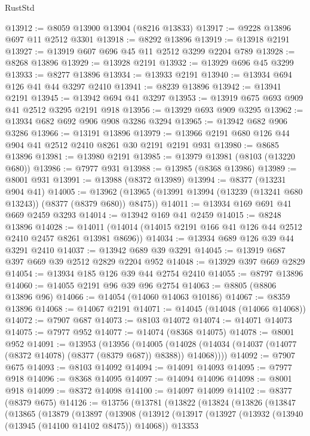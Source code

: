 \begin{lexlean}{RustStd}
\begin{coremodule}
@13912 := @8059 @13900 @13904 (@8216 @13833)
@13917 := @9228 @13896 @697 @11 @2512 @3301
@13918 := @8292 @13896
@13919 := @13918 @2191
@13927 := @13919 @607 @696 @45 @11 @2512 @3299 @2204 @789
@13928 := @8268 @13896
@13929 := @13928 @2191
@13932 := @13929 @696 @45 @3299
@13933 := @8277 @13896
@13934 := @13933 @2191
@13940 := @13934 @694 @126 @41 @44 @3297 @2410
@13941 := @8239 @13896
@13942 := @13941 @2191
@13945 := @13942 @694 @41 @3297
@13953 := @13919 @675 @693 @909 @41 @2512 @3295 @2191 @918
@13956 := @13929 @693 @909 @3295
@13962 := @13934 @682 @692 @906 @908 @3286 @3294
@13965 := @13942 @682 @906 @3286
@13966 := @13191 @13896
@13979 := @13966 @2191 @680 @126 @44 @904 @41 @2512 @2410 @8261 @30 @2191 @2191 @931
@13980 := @8685 @13896
@13981 := @13980 @2191
@13985 := @13979 @13981 (@8103 (@13220 @680))
@13986 := @7977 @931
@13988 := @13985 (@8368 @13986)
@13989 := @8001 @931
@13991 := @13988 (@8372 @13989)
@13994 := @8377 (@13231 @904 @41)
@14005 := @13962 (@13965 (@13991 @13994 (@13239 (@13241 @680 @13243)) (@8377 (@8379 @680)) @8475))
@14011 := @13934 @169 @691 @41 @669 @2459 @3293
@14014 := @13942 @169 @41 @2459
@14015 := @8248 @13896
@14028 := @14011 (@14014 (@14015 @2191 @166 @41 @126 @44 @2512 @2410 @2457 @8261 @13981 @8696))
@14034 := @13934 @689 @126 @39 @44 @3291 @2410
@14037 := @13942 @689 @39 @3291
@14045 := @13919 @687 @397 @669 @39 @2512 @2829 @2204 @952
@14048 := @13929 @397 @669 @2829
@14054 := @13934 @185 @126 @39 @44 @2754 @2410
@14055 := @8797 @13896
@14060 := @14055 @2191 @96 @39 @96 @2754
@14063 := @8805 (@8806 @13896 @96)
@14066 := @14054 (@14060 @14063 @10186)
@14067 := @8359 @13896
@14068 := @14067 @2191
@14071 := @14045 (@14048 (@14066 @14068))
@14072 := @7907 @687
@14073 := @8103 @14072
@14074 := @14071 @14073
@14075 := @7977 @952
@14077 := @14074 (@8368 @14075)
@14078 := @8001 @952
@14091 := @13953
    (@13956
      (@14005 (@14028 (@14034 (@14037 (@14077 (@8372 @14078) (@8377 (@8379 @687)) @8388)) @14068))))
@14092 := @7907 @675
@14093 := @8103 @14092
@14094 := @14091 @14093
@14095 := @7977 @918
@14096 := @8368 @14095
@14097 := @14094 @14096
@14098 := @8001 @918
@14099 := @8372 @14098
@14100 := @14097 @14099
@14102 := @8377 (@8379 @675)
@14126 := @13756
    (@13781
      (@13822
        (@13824
          (@13826
            (@13847
              (@13865
                (@13879
                  (@13897
                    (@13908
                      (@13912
                        (@13917
                          (@13927
                            (@13932 (@13940 (@13945 (@14100 @14102 @8475)) @14068))
                            @13353

\end{coremodule}
\end{lexlean}
